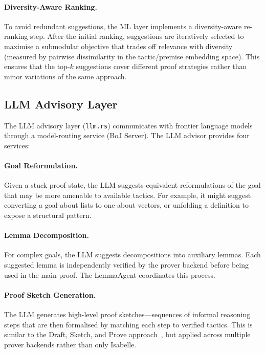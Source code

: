 \documentclass[11pt,a4paper]{article}
\begin{document}
\paragraph{Diversity-Aware Ranking.}
To avoid redundant suggestions, the ML layer implements a diversity-aware
re-ranking step. After the initial ranking, suggestions are iteratively
selected to maximise a submodular objective that trades off relevance with
diversity (measured by pairwise dissimilarity in the tactic/premise embedding
space). This ensures that the top-$k$ suggestions cover different proof
strategies rather than minor variations of the same approach.

\subsection{LLM Advisory Layer}

The LLM advisory layer (\texttt{llm.rs}) communicates with frontier language
models through a model-routing service (BoJ Server). The LLM advisor provides
four services:

\paragraph{Goal Reformulation.}
Given a stuck proof state, the LLM suggests equivalent reformulations of the
goal that may be more amenable to available tactics. For example, it might
suggest converting a goal about lists to one about vectors, or unfolding a
definition to expose a structural pattern.

\paragraph{Lemma Decomposition.}
For complex goals, the LLM suggests decompositions into auxiliary lemmas. Each
suggested lemma is independently verified by the prover backend before being
used in the main proof. The LemmaAgent coordinates this process.

\paragraph{Proof Sketch Generation.}
The LLM generates high-level proof sketches---sequences of informal reasoning
steps that are then formalised by matching each step to verified tactics. This
is similar to the Draft, Sketch, and Prove approach~\citep{dsp}, but applied
across multiple prover backends rather than only Isabelle.
\end{document}
